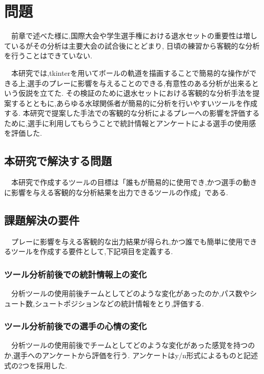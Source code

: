 \documentclass[../main.tex]{subfiles}
\begin{document}
\chapter{問題}
\par　前章で述べた様に,国際大会や学生選手権における退水セットの重要性は増しているがその分析は主要大会の試合後にとどまり,
日頃の練習から客観的な分析を行うことはできていない.
\par　本研究では,tkinterを用いてボールの軌道を描画することで簡易的な操作ができる上,選手のプレーに影響を与えることのできる,有意性のある分析が出来るという仮説を立てた.
その検証のために退水セットにおける客観的な分析手法を提案するとともに,あらゆる水球関係者が簡易的に分析を行いやすいツールを作成する.
本研究で提案した手法での客観的な分析によるプレーへの影響を評価するために,選手に利用してもらうことで統計情報とアンケートによる選手の使用感を評価した.


\section{本研究で解決する問題}
\par　本研究で作成するツールの目標は「誰もが簡易的に使用でき,かつ選手の動きに影響を与える客観的な分析結果を出力できるツールの作成」である.



\section{課題解決の要件}
\par　プレーに影響を与える客観的な出力結果が得られ,かつ誰でも簡単に使用できるツールを作成する要件として,下記項目を定義する.

\subsection{ツール分析前後での統計情報上の変化}
\par　分析ツールの使用前後チームとしてどのような変化があったのか,パス数やシュート数,シュートポジションなどの統計情報をとり,評価する.

\subsection{ツール分析前後での選手の心情の変化}
\par　分析ツールの使用前後でチームとしてどのような変化があった感覚を持つのか,選手へのアンケートから評価を行う.
アンケートはy/n形式によるものと記述式の2つを採用した.
\end{document}
